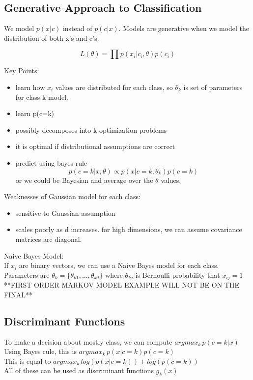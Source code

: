 \documentclass[11pt,psfig]{article}
\begin{document}
\subsection*{Generative Approach to Classification}

We model $p(x|c)$ instead of $p(c|x)$. Models are generative when we model the distribution of both x's and c's. 

\[
L(\theta) = \prod{p(x_i|c_i,\theta)p(c_i)}
\]

Key Points:
\begin{itemize}
\item learn how $x_i$ values are distributed for each class, so $\theta_k$ is set of parameters for class k model.
\item learn p(c=k)
\item possibly decomposes into k optimization problems
\item it is optimal if distributional assumptions are correct
\item predict using bayes rule\[
p(c=k|x,\theta)\propto p(x|c=k,\theta_k)p(c=k)
\]  or we could be Bayesian and average over the $\theta$ values. 
\end{itemize}

Weaknesses of Gaussian model for each class:
\begin{itemize}
\item sensitive to Gaussian assumption
\item scales poorly as d increases. for high dimensions, we can assume covariance matrices are diagonal. 
\end{itemize}

Naive Bayes Model:
\\
If $x_i$ are binary vectors, we can use a Naive Bayes model for each class. Parameters are $\theta_k = \{\theta_{k1},...,\theta_{kd}\}$ where $\theta_{kj}$ is Bernoulli probability that $x_{ij}=1$
\\
**FIRST ORDER MARKOV MODEL EXAMPLE WILL NOT BE ON THE FINAL**

\subsection*{Discriminant Functions}

To make a decision about mostly class, we can compute $argmax_k \,p(c=k|x)$\\
Using Bayes rule, this is $argmax_k \, p(x|c=k)p(c=k)$\\
This is equal to $argmax_k \, log(p(x|c=k)) + log(p(c=k))$
\\
All of these can be used as discriminant functions $g_k(x)$
\end{document}
